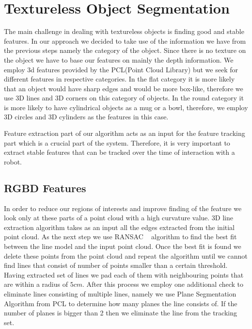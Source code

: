 \section{Textureless Object Segmentation}
\label{sec:textureless}

The main challenge in dealing with textureless objects is finding good and stable features. In our approach we decided to take use of the information we have from the previous steps namely the category of the object. Since there is no texture on the object we have to base our features on mainly the depth information. We employ 3d features provided by the PCL(Point Cloud Library) but we seek for different features in respective categories. In the flat category it is more likely that an object would have sharp edges and would be more box-like, therefore we use 3D lines and 3D corners on this category of objects. In the round category it is more likely to have cylindrical objects as a mug or a bowl, therefore, we employ 3D circles and 3D cylinders as the features in this case.

Feature extraction part of our algorithm acts as an input for the feature tracking part which is a crucial part of the system. Therefore, it is very important to extract stable features that can be tracked over the time of interaction with a robot.




\subsection{RGBD Features}
\label{sec:3dfeatures}
In order to reduce our regions of interests and improve finding of the feature we look only at these parts of a point cloud with a high curvature value. 3D line extraction algorithm takes as an input all the edges extracted from the initial point cloud. As the next step we use RANSAC ~\cite{ransac} algorithm to find the best fit between the line model and the input point cloud. Once the best fit is found we delete these points from the point cloud and repeat the algorithm until we cannot find lines that consist of number of points smaller than a certain threshold. Having extracted set of lines we pad each of them with neighbouring points that are within a radius of $5cm$. After this process we employ one additional check to eliminate lines consisting of multiple lines, namely we use Plane Segmentation Algorithm from PCL to determine how many planes the line consists of. If the number of planes is bigger than 2 then we eliminate the line from the tracking set.

